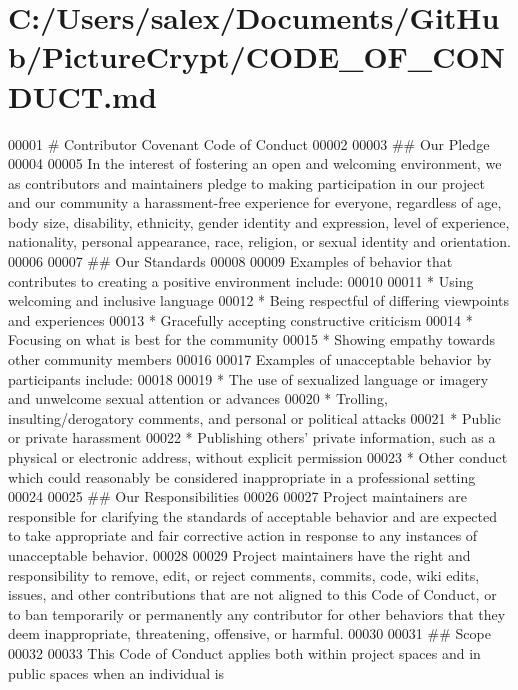 \hypertarget{_c_o_d_e___o_f___c_o_n_d_u_c_t_8md_source}{}\section{C\+:/\+Users/salex/\+Documents/\+Git\+Hub/\+Picture\+Crypt/\+C\+O\+D\+E\+\_\+\+O\+F\+\_\+\+C\+O\+N\+D\+U\+CT.md}

\begin{DoxyCode}
00001 # Contributor Covenant Code of Conduct
00002 
00003 ## Our Pledge
00004 
00005 In the interest of fostering an open and welcoming environment, we as contributors and maintainers
       pledge to making participation in our project and our community a harassment-free experience for everyone,
       regardless of age, body size, disability, ethnicity, gender identity and expression, level of experience,
       nationality, personal appearance, race, religion, or sexual identity and orientation.
00006 
00007 ## Our Standards
00008 
00009 Examples of behavior that contributes to creating a positive environment include:
00010 
00011 * Using welcoming and inclusive language
00012 * Being respectful of differing viewpoints and experiences
00013 * Gracefully accepting constructive criticism
00014 * Focusing on what is best for the community
00015 * Showing empathy towards other community members
00016 
00017 Examples of unacceptable behavior by participants include:
00018 
00019 * The use of sexualized language or imagery and unwelcome sexual attention or advances
00020 * Trolling, insulting/derogatory comments, and personal or political attacks
00021 * Public or private harassment
00022 * Publishing others' private information, such as a physical or electronic address, without explicit
       permission
00023 * Other conduct which could reasonably be considered inappropriate in a professional setting
00024 
00025 ## Our Responsibilities
00026 
00027 Project maintainers are responsible for clarifying the standards of acceptable behavior and are
       expected to take appropriate and fair corrective action in response to any instances of unacceptable behavior.
00028 
00029 Project maintainers have the right and responsibility to remove, edit, or reject comments, commits,
       code, wiki edits, issues, and other contributions that are not aligned to this Code of Conduct, or to ban
       temporarily or permanently any contributor for other behaviors that they deem inappropriate, threatening,
       offensive, or harmful.
00030 
00031 ## Scope
00032 
00033 This Code of Conduct applies both within project spaces and in public spaces when an individual is

\end{DoxyCode}
